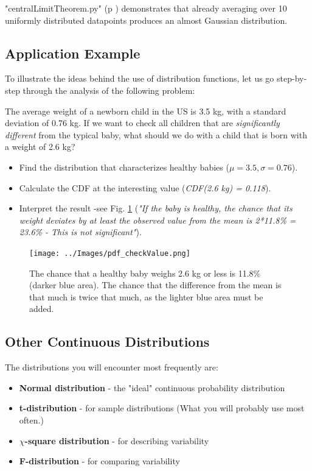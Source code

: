 \PyImg "centralLimitTheorem.py" (p \pageref{py:centralLimitTheorem}) demonstrates that already averaging over 10 uniformly distributed datapoints produces an almost Gaussian distribution.

\subsection{Application Example}

To illustrate the ideas behind the use of distribution functions, let us go step-by-step through the analysis of the following problem:

The average weight of a newborn child in the US is 3.5 kg, with a standard deviation of 0.76 kg. If we want to check all children that are \emph{significantly different} from the typical baby, what should we do with a child that is born with a weight of 2.6 kg?

\begin{itemize}
  \item Find the distribution that characterizes healthy babies ($\mu=3.5, \sigma=0.76$).
  \item Calculate the CDF at the interesting value (\emph{CDF(2.6 kg) = 0.118}).
  \item Interpret the result -see Fig. \ref{fig:pdf_checkValue} (\emph{"If the baby is healthy, the chance that its weight deviates by at least the observed value from the mean is 2*11.8\% = 23.6\% - This is not significant"}).
\end{itemize}

\begin{figure}
  \centering
  \texttt{[image: ../Images/pdf\_checkValue.png]}\\
  \caption{The chance that a healthy baby weighs 2.6 kg or less is 11.8\% (darker blue area). The chance that the difference from the mean is that much is twice that much, as the lighter blue area must be added.}\label{fig:pdf_checkValue}
\end{figure}

\subsection{Other Continuous Distributions}\label{sec:ContinuousDistributions} 

The distributions you will encounter most frequently are:

\begin{itemize}
  \item \textbf{Normal distribution} - the "ideal" continuous probability distribution
  \item \textbf{t-distribution} - for sample distributions (What you will probably use most often.)
  \item \textbf{$\chi$-square distribution} - for describing  variability
  \item \textbf{F-distribution} - for comparing variability
\end{itemize}

